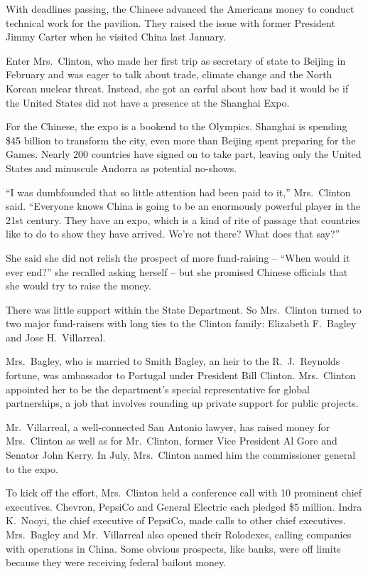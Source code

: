﻿\documentclass[12pt]{article}
\begin{document}
With deadlines passing, the Chinese advanced the Americans money to conduct technical work for the
pavilion. They raised the issue with former President Jimmy Carter when he visited China last
January.

Enter Mrs.~Clinton, who made her first trip as secretary of state to Beijing in February and was
eager to talk about trade, climate change and the North Korean nuclear threat. Instead, she got an
earful about how bad it would be if the United States did not have a presence at the Shanghai Expo.

For the Chinese, the expo is a bookend to the Olympics. Shanghai is spending \$45 billion to
transform the city, even more than Beijing spent preparing for the Games. Nearly 200 countries have
signed on to take part, leaving only the United States and minuscule Andorra as potential no-shows.

``I was dumbfounded that so little attention had been paid to it,'' Mrs.~Clinton said. ``Everyone
knows China is going to be an enormously powerful player in the 21st century. They have an expo,
which is a kind of rite of passage that countries like to do to show they have arrived. We're not
there? What does that say?''

She said she did not relish the prospect of more fund-raising -- ``When would it ever end?'' she
recalled asking herself -- but she promised Chinese officials that she would try to raise the money.

There was little support within the State Department. So Mrs.~Clinton turned to two major
fund-raisers with long ties to the Clinton family: Elizabeth F.~Bagley and Jose H.~Villarreal.

Mrs.~Bagley, who is married to Smith Bagley, an heir to the R.~J.~Reynolds fortune, was ambassador
to Portugal under President Bill Clinton. Mrs.~Clinton appointed her to be the department's special
representative for global partnerships, a job that involves rounding up private support for public
projects.

Mr.~Villarreal, a well-connected San Antonio lawyer, has raised money for Mrs.~Clinton as well as
for Mr.~Clinton, former Vice President Al Gore and Senator John Kerry. In July, Mrs.~Clinton named
him the commissioner general to the expo.

To kick off the effort, Mrs.~Clinton held a conference call with 10 prominent chief executives.
Chevron, PepsiCo and General Electric each pledged \$5 million. Indra K.~Nooyi, the chief executive
of PepsiCo, made calls to other chief executives. Mrs.~Bagley and Mr.~Villarreal also opened their
Rolodexes, calling companies with operations in China. Some obvious prospects, like banks, were off
limits because they were receiving federal bailout money.
\end{document}
